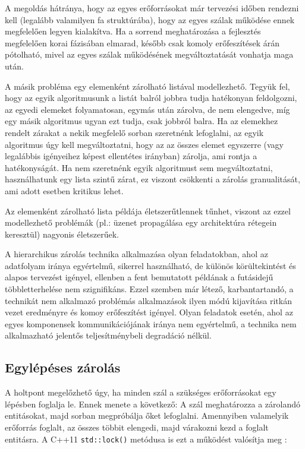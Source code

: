     A megoldás hátránya, hogy az egyes erőforrásokat már tervezési időben rendezni kell (legalább valamilyen fa struktúrába), hogy az egyes szálak működése ennek megfelelően legyen kialakítva. Ha a sorrend meghatározása a fejlesztés megfelelően korai fázisában elmarad, később csak komoly erőfeszítések árán pótolható, mivel az egyes szálak működésének megváltoztatását vonhatja maga után. 
    
    A másik probléma egy elemenként zárolható listával modellezhető. Tegyük fel, hogy az egyik algoritmusunk a listát balról jobbra tudja hatékonyan feldolgozni, az egyedi elemeket folyamatosan, egymás után zárolva, de nem elengedve, míg egy másik algoritmus ugyan ezt tudja, csak jobbról balra. Ha az elemekhez rendelt zárakat a nekik megfelelő sorban szeretnénk lefoglalni, az egyik algoritmus úgy kell megváltoztatni, hogy az az összes elemet egyszerre (vagy legalábbis igényeihez képest ellentétes irányban) zárolja, ami rontja a hatékonyságát. Ha nem szeretnénk egyik algoritmust sem megváltoztatni, használhatunk egy lista szintű zárat, ez viszont csökkenti a zárolás granualitását, ami adott esetben kritikus lehet.
    
    Az elemenként zárolható lista példája életszerűtlennek tűnhet, viszont az ezzel modellezhető problémák (pl.: üzenet propagálása egy architektúra rétegein keresztül) nagyonis életszerűek.
    
    A hierarchikus zárolás technika alkalmazása olyan feladatokban, ahol az adatfolyam iránya egyértelmű, sikerrel használható, de különös körültekintést és alapos tervezést igényel, ellenben a fent bemutatott példának a futásidejű többletterhelése nem szignifikáns. Ezzel szemben már létező, karbantartandó, a technikát nem alkalmazó problémás alkalmazások ilyen módú kijavítása ritkán vezet eredményre és komoy erőfeszítést igényel. Olyan feladatok esetén, ahol az egyes komponensek kommunikációjának iránya nem egyértelmű, a technika nem alkalmazható jelentős teljesítménybeli degradáció nélkül.
    
    \subsection{Egylépéses zárolás}
    
    A holtpont megelőzhető úgy, ha minden szál a szükséges erőforrásokat egy lépésben foglalja le. Ennek menete a következő: A szál meghatározza a zárolandó entitásokat, majd sorban megpróbálja őket lefoglalni. Amennyiben valamelyik erőforrás foglalt, az összes többit elengedi, majd várakozni kezd a foglalt entitásra. A C++11 \texttt{std::lock()} metódusa is ezt a működést valósítja meg \cite{C++11/lock}:
    

